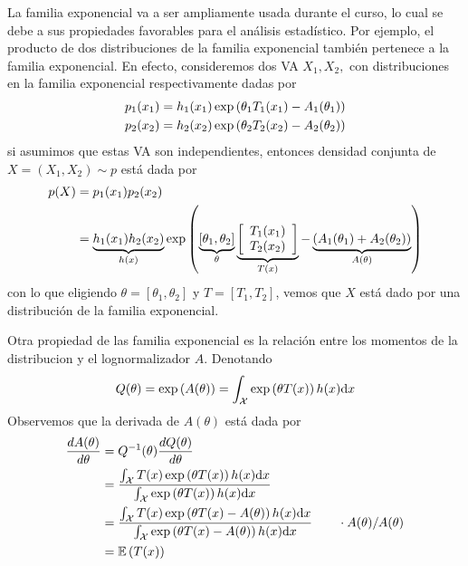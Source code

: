 La familia exponencial va a ser ampliamente usada durante el curso, lo cual se debe a sus propiedades favorables para el análisis estadístico. Por ejemplo, el producto de dos distribuciones de la familia exponencial también pertenece a la familia exponencial. En efecto, consideremos dos VA $X_1,X_2,$ con distribuciones en la familia exponencial respectivamente dadas por
\begin{align}
	p_1(x_1) &= h_1(x_1)\exp\left(\theta_1T_1(x_1)-{A_1(\theta_1)}\right)\\
	p_2(x_2) &= h_2(x_2)\exp\left(\theta_2T_2(x_2)-{A_2(\theta_2)}\right)
\end{align}
si asumimos que estas VA son independientes, entonces densidad conjunta de $X=(X_1,X_2)\sim p$ está dada por
\begin{align}
	p(X) 	&= p_1(x_1) p_2(x_2) \nonumber \\ 
			&= \underbrace{h_1(x_1)h_2(x_2)}_{h(x)}\exp\left(\underbrace{[\theta_1,\theta_2]}_{\theta}\underbrace{
			\left[ \begin{array}{c}
			T_1(x_1)  \\
			T_2(x_2)  \end{array} \right]
			}_{T(x)} - \underbrace{\left(A_1(\theta_1)+A_2(\theta_2) \right)}_{A(\theta)}\right) 
\end{align}
con lo que eligiendo $\theta=[\theta_1,\theta_2]$ y $T=[T_1,T_2]$, vemos que $X$ está dado por una distribución de la familia exponencial.  

Otra propiedad de las familia exponencial es la relación entre los momentos de la distribucion y el lognormalizador $A$. Denotando
\begin{equation}
	Q(\theta) =\exp\left(A(\theta)\right) = \int_{\mathcal X} \exp\left(\theta T (x)\right)h(x){\text{d}x}
\end{equation}
Observemos que la derivada de $A(\theta)$ está dada por 
\begin{align}
	\frac{dA(\theta)}{d\theta} &= Q^{-1}(\theta)\frac{d Q(\theta)}{d\theta} \\ 
	&= \frac{\int_{\mathcal X} T (x) \exp\left(\theta T (x)\right)h(x){\text{d}x}}{\int_{\mathcal X} \exp\left(\theta T (x)\right)h(x){\text{d}x}} \nonumber\\
	&= \frac{\int_{\mathcal X} T (x) \exp\left(\theta T (x) -A(\theta)\right)h(x){\text{d}x}}{\int_{\mathcal X} \exp\left(\theta T (x)-A(\theta) \right)h(x){\text{d}x}} \quad\quad \cdot  A(\theta)/A(\theta) \nonumber\\
	&=\mathbb{E} \left(T(x)\right)  \nonumber
\end{align}